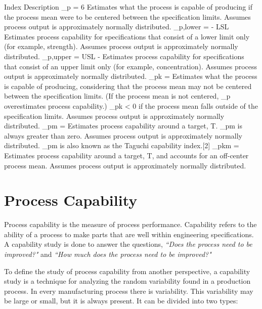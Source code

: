 \documentclass[SPC-MASTER.tex]{subfiles}
\begin{document}
\Large

Index	Description
_p =  {6 \hat{\sigma}}	Estimates what the process is capable of producing if the process mean were to be centered between the specification limits. Assumes process output is approximately normally distributed.
_{p,lower} = {\hat{\mu} - LSL  \hat{\sigma}}	Estimates process capability for specifications that consist of a lower limit only (for example, strength). Assumes process output is approximately normally distributed.
_{p,upper} = {USL - \hat{\mu}  \hat{\sigma}}	Estimates process capability for specifications that consist of an upper limit only (for example, concentration). Assumes process output is approximately normally distributed.
_{pk} = \min {}	Estimates what the process is capable of producing, considering that the process mean may not be centered between the specification limits. (If the process mean is not centered, _p overestimates process capability.) _{pk} < 0 if the process mean falls outside of the specification limits. Assumes process output is approximately normally distributed.
_{pm} =  {  }	Estimates process capability around a target, T. _{pm} is always greater than zero. Assumes process output is approximately normally distributed. _{pm} is also known as the Taguchi capability index.[2]
_{pkm} =  {  }	Estimates process capability around a target, T, and accounts for an off-center process mean. Assumes process output is approximately normally distributed.


\section{Process Capability}
Process capability is the measure of process performance. Capability refers to the ability of a process to make parts that are well within engineering specifications. A capability study is done to answer the questions, \textit{``Does the process need to be improved?"} and  \textit{``How much does the process need to be improved?"}

To define the study of process capability from another perspective, a capability study is a technique for analyzing the random variability found in a production process. In every manufacturing process there is variability. This variability may be large or small, but it is always present. It can be divided into two types:
\end{document}
